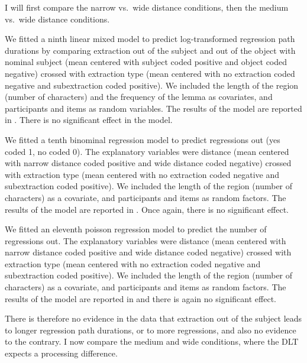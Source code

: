 I will first compare the narrow vs.\ wide distance conditions, then the medium vs.\ wide distance conditions.

We fitted a ninth linear mixed model to predict log-transformed regression path durations by comparing extraction out of the subject and out of the object with nominal subject (mean centered with subject coded positive and object coded negative) crossed with extraction type (mean centered with no extraction coded negative and subextraction coded positive). We included the length of the region (number of characters) and the frequency of the lemma as covariates, and participants and items as random variables. 
The results of the model are reported in . There is no significant effect in the model.



We fitted a tenth binominal regression model to predict regressions out (yes coded 1, no coded 0). The explanatory variables were distance (mean centered with narrow distance coded positive and wide distance coded negative) crossed with extraction type (mean centered with no extraction coded negative and subextraction coded positive). We included the length of the region (number of characters) as a covariate, and participants and items as random factors. 
The results of the model are reported in . Once again, there is no significant effect.



We fitted an eleventh poisson regression model to predict the number of regressions out. The explanatory variables were distance (mean centered with narrow distance coded positive and wide distance coded negative) crossed with extraction type (mean centered with no extraction coded negative and subextraction coded positive). We included the length of the region (number of characters) as a covariate, and participants and items as random factors. 
The results of the model are reported in  and there is again no significant effect.



There is therefore no evidence in the data that extraction out of the subject leads to longer regression path durations, or to more regressions, and also no evidence to the contrary. I now compare the medium and wide conditions, where the DLT expects a processing difference.


